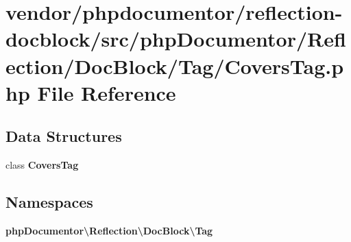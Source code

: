 \section{vendor/phpdocumentor/reflection-\/docblock/src/php\+Documentor/\+Reflection/\+Doc\+Block/\+Tag/\+Covers\+Tag.php File Reference}
\label{_covers_tag_8php}
\subsection*{Data Structures}
\begin{DoxyCompactItemize}
\item 
class {\bf Covers\+Tag}
\end{DoxyCompactItemize}
\subsection*{Namespaces}
\begin{DoxyCompactItemize}
\item 
 {\bf php\+Documentor\textbackslash{}\+Reflection\textbackslash{}\+Doc\+Block\textbackslash{}\+Tag}
\end{DoxyCompactItemize}
